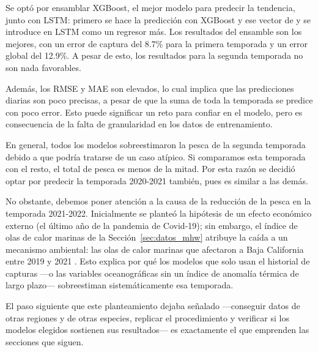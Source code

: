 Se optó por ensamblar XGBoost, el mejor modelo para predecir la tendencia, junto con LSTM: primero se hace la predicción con XGBoost y ese vector de y se introduce en LSTM como un regresor más. Los resultados del ensamble son los mejores, con un error de captura del 8.7\% para la primera temporada y un error global del 12.9\%. A pesar de esto, los resultados para la segunda temporada no son nada favorables. 

Además, los RMSE y MAE son elevados, lo cual implica que las predicciones diarias son poco precisas, a pesar de que la suma de toda la temporada se predice con poco error. Esto puede significar un reto para confiar en el modelo, pero es consecuencia de la falta de granularidad en los datos de entrenamiento.

En general, todos los modelos sobreestimaron la pesca de la segunda temporada debido a que podría tratarse de un caso atípico. Si comparamos esta temporada con el resto, el total de pesca es menos de la mitad. Por esta razón se decidió optar por predecir la temporada 2020-2021 también, pues es similar a las demás.

No obstante, debemos poner atención a la causa de la reducción de la pesca en la temporada 2021-2022. Inicialmente se planteó la hipótesis de un efecto económico externo (el último año de la pandemia de Covid-19); sin embargo, el índice de olas de calor marinas de la Sección~\ref{sec:datos_mhw} atribuye la caída a un mecanismo ambiental: las olas de calor marinas que afectaron a Baja California entre 2019 y 2021 \citep{villasenor2024}. Esto explica por qué los modelos que solo usan el historial de capturas —o las variables oceanográficas sin un índice de anomalía térmica de largo plazo— sobreestiman sistemáticamente esa temporada.

El paso siguiente que este planteamiento dejaba señalado ---conseguir datos de otras regiones y de otras especies, replicar el procedimiento y verificar si los modelos elegidos sostienen sus resultados--- es exactamente el que emprenden las secciones que siguen.
